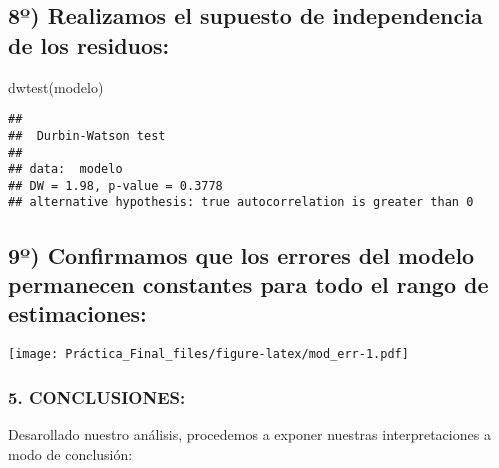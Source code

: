 \documentclass[
]{article}
\newenvironment{Shaded}{\begin{snugshade}}{\end{snugshade}}
\newcommand{\AttributeTok}[1]{\textcolor[rgb]{0.77,0.63,0.00}{#1}}
\newcommand{\FunctionTok}[1]{\textcolor[rgb]{0.00,0.00,0.00}{#1}}
\newcommand{\NormalTok}[1]{#1}
\newcommand{\SpecialCharTok}[1]{\textcolor[rgb]{0.00,0.00,0.00}{#1}}
\newcommand{\StringTok}[1]{\textcolor[rgb]{0.31,0.60,0.02}{#1}}
\begin{document}
\hypertarget{uxba-realizamos-el-supuesto-de-independencia-de-los-residuos}{%
\subsection{8º) Realizamos el supuesto de independencia de los
residuos:}\label{uxba-realizamos-el-supuesto-de-independencia-de-los-residuos}}

\begin{Shaded}
\begin{Highlighting}[]
\FunctionTok{dwtest}\NormalTok{(modelo)}
\end{Highlighting}
\end{Shaded}

\begin{verbatim}
## 
##  Durbin-Watson test
## 
## data:  modelo
## DW = 1.98, p-value = 0.3778
## alternative hypothesis: true autocorrelation is greater than 0
\end{verbatim}

\hypertarget{uxba-confirmamos-que-los-errores-del-modelo-permanecen-constantes-para-todo-el-rango-de-estimaciones}{%
\subsection{9º) Confirmamos que los errores del modelo permanecen
constantes para todo el rango de
estimaciones:}\label{uxba-confirmamos-que-los-errores-del-modelo-permanecen-constantes-para-todo-el-rango-de-estimaciones}}

\begin{Shaded}
\end{Shaded}

\texttt{[image: Práctica\_Final\_files/figure-latex/mod\_err-1.pdf]}

\hypertarget{conclusiones}{%
\subsubsection{5. CONCLUSIONES:}\label{conclusiones}}

Desarollado nuestro análisis, procedemos a exponer nuestras
interpretaciones a modo de conclusión:
\end{document}
